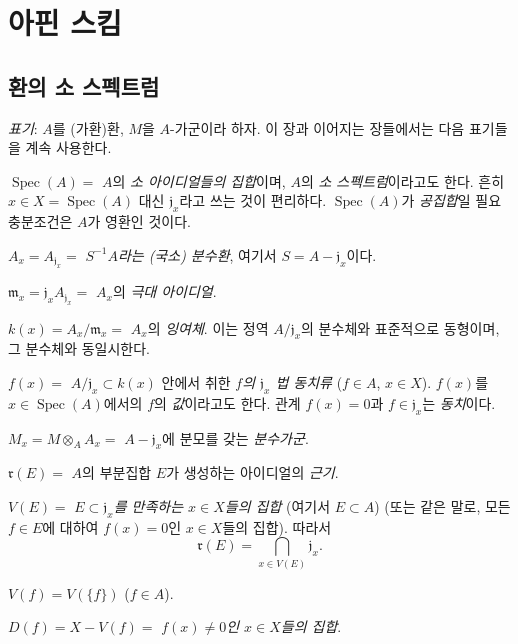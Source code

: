 \setcounter{section}{0}
\section{아핀 스킴}
\label{section:I.1-ko}

\setcounter{subsection}{0}
\subsection{환의 소 스펙트럼}
\label{subsection:I.1.1-ko}

\begin{env}[1.1.1]
\label{I.1.1.1-ko}
\emph{표기}: $A$를 (가환)환, $M$을 $A$-가군이라 하자. 이 장과
이어지는 장들에서는 다음 표기들을 계속 사용한다.

\smallskip
\noindent
$\operatorname{Spec}(A)={}$ $A$의 \emph{소 아이디얼들의 집합}이며,
$A$의 \emph{소 스펙트럼}이라고도 한다. 흔히
$x\in X=\operatorname{Spec}(A)$ 대신 $\mathfrak{j}_x$라고 쓰는 것이
편리하다. $\operatorname{Spec}(A)$가 \emph{공집합}일 필요충분조건은
$A$가 영환인 것이다.

\smallskip
\noindent
$A_x=A_{\mathfrak{j}_x}={}$ \emph{$S^{-1}A$라는 (국소) 분수환},
여기서 $S=A-\mathfrak{j}_x$이다.

\smallskip
\noindent
$\mathfrak{m}_x=\mathfrak{j}_xA_{\mathfrak{j}_x}={}$ $A_x$의
\emph{극대 아이디얼}.

\smallskip
\noindent
$k(x)=A_x/\mathfrak{m}_x={}$ $A_x$의 \emph{잉여체}. 이는 정역
$A/\mathfrak{j}_x$의 분수체와 표준적으로 동형이며, 그 분수체와
동일시한다.

\smallskip
\noindent
$f(x)={}$ $A/\mathfrak{j}_x\subset k(x)$ 안에서 취한 \emph{$f$의
$\mathfrak{j}_x$ 법 동치류} ($f\in A$, $x\in X$). $f(x)$를
$x\in\operatorname{Spec}(A)$에서의 $f$의 \emph{값}이라고도 한다.
관계 $f(x)=0$과 $f\in\mathfrak{j}_x$는 \emph{동치}이다.

\smallskip
\noindent
$M_x=M\otimes_AA_x={}$ $A-\mathfrak{j}_x$에 분모를 갖는
\emph{분수가군}.

\smallskip
\noindent
$\mathfrak{r}(E)={}$ $A$의 부분집합 $E$가 생성하는 아이디얼의
\emph{근기}.

\smallskip
\noindent
$V(E)={}$ \emph{$E\subset\mathfrak{j}_x$를 만족하는 $x\in X$들의 집합}
(여기서 $E\subset A$)
(또는 같은 말로, 모든 $f\in E$에 대하여 $f(x)=0$인 $x\in X$들의
집합). 따라서
\begin{equation}
  \mathfrak{r}(E)=\bigcap_{x\in V(E)}\mathfrak{j}_x.
  \tag{1.1.1.1}\label{I.1.1.1.1-ko}
\end{equation}

\smallskip
\noindent
$V(f)=V(\{f\})$ ($f\in A$).

\smallskip
\noindent
$D(f)=X-V(f)={}$ \emph{$f(x)\neq0$인 $x\in X$들의 집합}.
\end{env}


